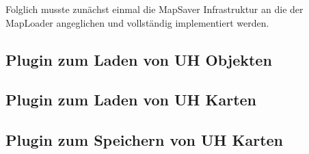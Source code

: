 Folglich musste zunächst einmal die MapSaver Infrastruktur an die der MapLoader angeglichen und vollständig
implementiert werden.

\subsection{Plugin zum Laden von UH Objekten}
\subsection{Plugin zum Laden von UH Karten}
\subsection{Plugin zum Speichern von UH Karten}



